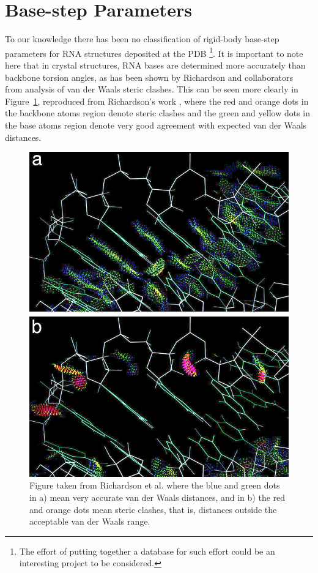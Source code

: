 \section{Base-step Parameters}

To our  knowledge there has  been no classification of rigid-body
base-step  parameters for RNA structures deposited at  the
PDB \footnote{The effort of putting together a database for such effort
could be an  interesting project to be considered.}.   It is important
to note here that in  crystal structures, RNA bases are determined more
accurately  than  backbone  torsion  angles,  as  has  been  shown  by
Richardson  and collaborators from  analysis of  van der  Waals steric
clashes.   This can  be seen  more clearly  in Figure~\ref{fig:murray},
reproduced from Richardson's work \cite{murray2003}, where the red
and orange dots  in the backbone atoms region  denote steric clashes and
the green  and yellow  dots in  the base atoms  region denote  very good
agreement with expected van der Waals distances.

\begin{figure}[htbp]
 \centering
 \includegraphics[scale=0.5]{murray2003.png}
 \caption{Figure taken from  Richardson et al. \cite{murray2003} where
 the  blue and  green dots  in  a) mean  very accurate  van der  Waals
 distances, and  in b)  the red and  orange dots mean  steric clashes,
 that is, distances outside the acceptable van der Waals range.}
 \label{fig:murray}
\end{figure}

